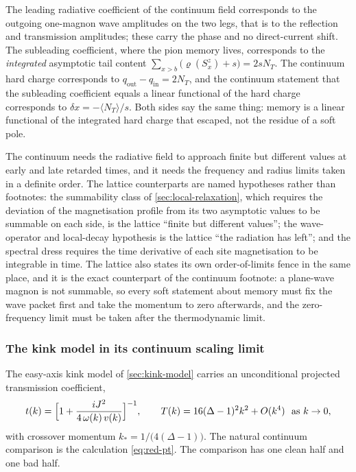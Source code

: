 \begin{observation}
\label{obs:falloff-dictionary}
The leading radiative coefficient of the continuum field corresponds to the
outgoing one-magnon wave amplitudes on the two legs, that is to the reflection
and transmission amplitudes; these carry the phase and no direct-current shift.
The subleading coefficient, where the pion memory lives, corresponds to the
\emph{integrated} asymptotic tail content $\sum_{x>b}\bigl(\varrho(S^z_x)+s\bigr)=2sN_T$.
The continuum hard charge corresponds to $q_{\mathrm{out}}-q_{\mathrm{in}}=2N_T$,
and the continuum statement that the subleading coefficient equals a linear
functional of the hard charge corresponds to $\delta x=-\langle N_T\rangle/s$.
Both sides say the same thing: memory is a linear functional of the integrated
hard charge that escaped, not the residue of a soft pole.
\end{observation}

\begin{observation}
\label{obs:falloff-hypotheses}
The continuum needs the radiative field to approach finite but different values
at early and late retarded times, and it needs the frequency and radius limits
taken in a definite order. The lattice counterparts are named hypotheses rather
than footnotes: the summability class of \cref{sec:local-relaxation}, which
requires the deviation of the magnetisation profile from its two asymptotic
values to be summable on each side, is the lattice ``finite but different
values''; the wave-operator and local-decay hypothesis is the lattice ``the
radiation has left''; and the spectral dress requires the time derivative of
each site magnetisation to be integrable in time. The lattice also states its
own order-of-limits fence in the same place, and it is the exact counterpart of
the continuum footnote: a plane-wave magnon is not summable, so every soft
statement about memory must fix the wave packet first and take the momentum to
zero afterwards, and the zero-frequency limit must be taken after the
thermodynamic limit.
\end{observation}

\subsubsection*{The kink model in its continuum scaling limit}

The easy-axis kink model of \cref{sec:kink-model} carries an unconditional
projected transmission coefficient,
\begin{equation}
  t(k)=\Bigl[1+\frac{iJ^2}{4\,\omega(k)\,v(k)}\Bigr]^{-1},
  \qquad
  T(k)=16(\Delta-1)^2k^2+O(k^4)\ \ \text{as }k\to0,
  \label{eq:red-tk}
\end{equation}
with crossover momentum $k_*=1/\bigl(4(\Delta-1)\bigr)$. The natural continuum
comparison is the calculation \eqref{eq:red-pt}. The comparison has one clean
half and one bad half.

